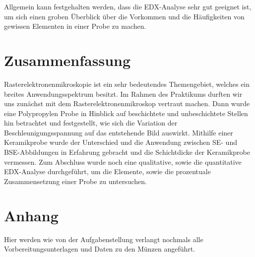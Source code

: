 \documentclass[12pt,english,ngerman]{scrartcl}
\begin{document}
Allgemein kann festgehalten werden, dass die EDX-Analyse sehr gut geeignet ist,
um sich einen groben Überblick über die Vorkommen und die Häufigkeiten von
gewissen Elementen in einer Probe zu machen.

\section{Zusammenfassung}

Rasterelektronenmikroskopie ist ein sehr bedeutendes Themengebiet, welches ein
breites Anwendungsspektrum besitzt. Im Rahmen des Praktikums durften wir uns
zunächst mit dem Rasterelektronenmikroskop vertraut machen. Dann wurde eine
Polypropylen Probe in Hinblick auf beschichtete und unbeschichtete Stellen hin
betrachtet und festgestellt, wie sich die Variation der Beschleunigungsspannung
auf das entstehende Bild auswirkt. Mithilfe einer Keramikprobe wurde der
Unterschied und die Anwendung zwischen SE- und BSE-Abbildungen in Erfahrung
gebracht und die Schichtdicke der Keramikprobe vermessen. Zum Abschluss wurde
noch eine qualitative, sowie die quantitative EDX-Analyse durchgeführt, um die
Elemente, sowie die prozentuale Zusammensetzung einer Probe zu untersuchen.

\printbibliography{}

\appendix
\renewcommand{\thesection}{\Roman{section}}
\section{Anhang}

Hier werden wie von der Aufgabenstellung verlangt nochmals alle
Vorbereitungsunterlagen und Daten zu den Münzen angeführt.



\end{document}
